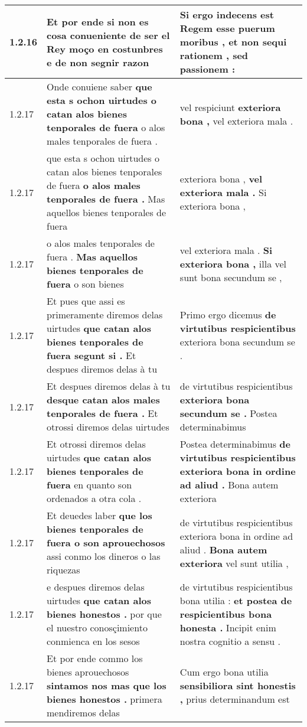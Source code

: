 \begin{tabular}{|p{1cm}|p{6.5cm}|p{6.5cm}|}
1.2.16 & Et por ende si non es cosa conueniente \textbf{ de ser el Rey moço en costunbres } e de non segnir razon & Si ergo indecens est Regem \textbf{ esse puerum moribus , } et non sequi rationem , sed passionem : \\\hline
1.2.17 & Onde conuiene saber \textbf{ que esta s ochon uirtudes o catan alos bienes tenporales de fuera } o alos males tenporales de fuera . & vel respiciunt \textbf{ exteriora bona , } vel exteriora mala . \\\hline
1.2.17 & que esta s ochon uirtudes o catan alos bienes tenporales de fuera \textbf{ o alos males tenporales de fuera . } Mas aquellos bienes tenporales de fuera & exteriora bona , \textbf{ vel exteriora mala . } Si exteriora bona , \\\hline
1.2.17 & o alos males tenporales de fuera . \textbf{ Mas aquellos bienes tenporales de fuera } o son bienes & vel exteriora mala . \textbf{ Si exteriora bona , } illa vel sunt bona secundum se , \\\hline
1.2.17 & Et pues que assi es primeramente diremos delas uirtudes \textbf{ que catan alos bienes tenporales de fuera segunt si . } Et despues diremos delas à tu & Primo ergo dicemus \textbf{ de virtutibus respicientibus } exteriora bona secundum se . \\\hline
1.2.17 & Et despues diremos delas à tu \textbf{ desque catan alos males tenporales de fuera . } Et otrossi diremos delas uirtudes & de virtutibus respicientibus \textbf{ exteriora bona secundum se . } Postea determinabimus \\\hline
1.2.17 & Et otrossi diremos delas uirtudes \textbf{ que catan alos bienes tenporales de fuera } en quanto son ordenados a otra cola . & Postea determinabimus \textbf{ de virtutibus respicientibus exteriora bona in ordine ad aliud . } Bona autem exteriora \\\hline
1.2.17 & Et deuedes laber \textbf{ que los bienes tenporales de fuera o son aprouechosos } assi conmo los dineros o las riquezas & de virtutibus respicientibus exteriora bona in ordine ad aliud . \textbf{ Bona autem exteriora } vel sunt utilia , \\\hline
1.2.17 & e despues diremos delas uirtudes \textbf{ que catan alos bienes honestos . } por que el nuestro conosçimiento conmienca en los sesos & de virtutibus respicientibus bona utilia : \textbf{ et postea de respicientibus bona honesta . } Incipit enim nostra cognitio a sensu . \\\hline
1.2.17 & Et por ende commo los bienes aprouechosos \textbf{ sintamos nos mas que los bienes honestos . } primera mendiremos delas & Cum ergo bona utilia \textbf{ sensibiliora sint honestis , } prius determinandum est \\\hline

\end{tabular}
